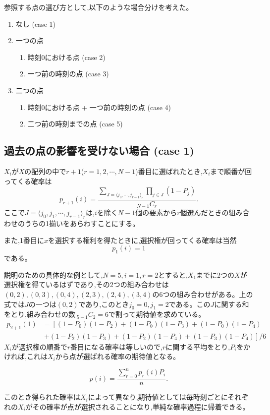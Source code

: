参照する点の選び方として,以下のような場合分けを考えた。

\begin{enumerate}
    \item なし (case 1)
    \item 一つの点
    \begin{enumerate}
        \item 時刻0における点 (case 2)
        \item 一つ前の時刻の点 (case 3)
        \end{enumerate}
    \item 二つの点
    \begin{enumerate}
        \item 時刻0における点 + 一つ前の時刻の点 (case 4)
        \item 二つ前の時刻までの点 (case 5)
        \end{enumerate}
\end{enumerate}

\subsection{過去の点の影響を受けない場合 (case 1)}

$X_{i}$が$X$の配列の中で$r+1$($r = 1, 2, \cdots , N-1$)番目に選ばれたとき,$X_{i}$まで順番が回ってくる確率は
\[p_{r+1}(i) = \frac{\sum_{J = \langle j_{0}, \cdots ,j_{r-1} \rangle _{r}}\prod_{j\in J}(1-P_{j})}{_{N-1}C_{r}}.\]
ここで$J = \langle j_{0}, j_{1}, \cdots ,j_{r-1} \rangle_{r}$は,$i$を除く$N-1$個の要素から$r$個選んだときの組み合わせのうちの1揃いをあらわすことにする。

また,1番目に$x$を選択する権利を得たときに,選択権が回ってくる確率は当然
\[p_{1}(i) = 1\]
である。

説明のための具体的な例として,$N = 5, i = 1, r = 2$とすると,$X_{1}$までに2つの$X$が選択権を得ているはずであり,その2つの組み合わせは$(0,2), (0,3), (0,4), (2,3), (2,4), (3,4)$の6つの組み合わせがある。上の式では$J$の一つは$(0, 2)$であり,このとき$j_{0} = 0, j_{1} = 2$である。この$J$に関する和をとり,組み合わせの数$\ _{5-1}C_{2} = 6$で割って期待値を求めている。
\begin{align}
p_{2+1}(1) &= \left[(1-P_{0})(1-P_{2}) + (1-P_{0})(1-P_{3}) + (1-P_{0})(1-P_{4}) \right. \nonumber \\
&\ \left. + (1-P_{2})(1-P_{3}) + (1-P_{2})(1-P_{4}) + (1-P_{3})(1-P_{4}) \right]/6
\end{align}
$X_{i}$が選択権の順番で$r$番目になる確率は等しいので,$r$に関する平均をとり,$P_{i}$をかければ,これは$X_{i}$から点が選ばれる確率の期待値となる。

\[p(i) = \frac{\sum_{r=0}^{n}p_{r}(i)P_{i}}{n}.\]

このとき得られた確率は$X_{i}$によって異なり,期待値としては毎時刻ごとにそれぞれの$X_{i}$がその確率が点が選択されることになり,単純な確率過程に帰着できる。

